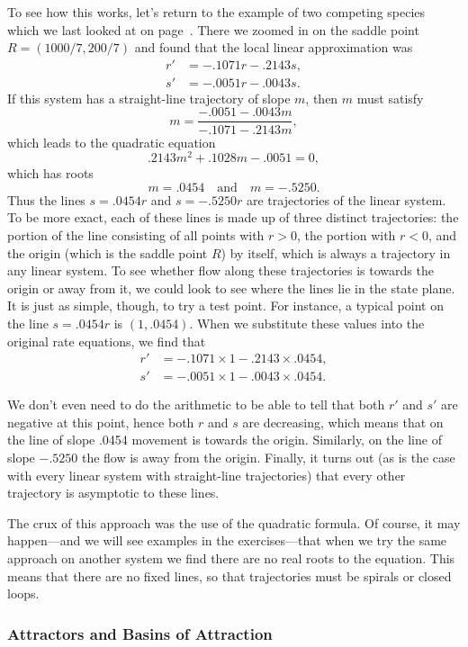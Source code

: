 To see how this works, let's return to the example of two competing
species which we last looked at on page~\pageref{`saddle'}.  There we
zoomed in on the saddle point $R=(1000/7, 200/7)$ and found that the
local linear approximation was
\begin{align*}
r' &= -.1071r -.2143s, \\
s' &= -.0051r - .0043s.
\end{align*}
If this system has a straight-line trajectory of slope $m$, then $m$
must satisfy
        \[
m= \dfrac{ -.0051 - .0043m}{ -.1071 -.2143m},
\]
which leads to the quadratic equation
        \[
.2143m^2+.1028m-.0051=0,
\]
which has roots
        \[
m=.0454 \quad \mbox{and} \quad m = -.5250.
\] 
Thus the lines $s=.0454r$ and $s=-.5250r$ are trajectories of the
linear system.  To be more exact, each of these lines is made up of
three distinct trajectories: the portion of the line consisting of all
points with $r>0$, the portion with $r<0$, and the origin (which is
the saddle point $R$) by itself, which is always a trajectory in any
linear system.  To see whether flow along these trajectories is
towards the origin or away from it, we could look to see where the
lines lie in the state plane.  It is just as simple, though, to try a
test point.  For instance, a typical point on the line $s=.0454r$ is
$(1, .0454)$.  When we substitute these values into the original rate
equations, we find that
\begin{align*}
r' &= -.1071\times 1-.2143\times .0454, \\
s' &= -.0051\times 1 - .0043 \times .0454.
\end{align*}

We don't even need to do the arithmetic to be able to tell that both
$r'$ and $s'$ are negative at this point, hence both $r$ and $s$ are
decreasing, which means that on the line of slope .0454 movement is
towards the origin.  Similarly, on the line of slope $-.5250$ the flow
is away from the origin.  Finally, it turns out (as is the case with
every linear system with straight-line trajectories) that every other
trajectory is asymptotic to these lines.

The crux of this approach was the use of the quadratic formula.  Of
course, it may happen---and we will see examples in the
exercises---that when we try the same approach on another system we
find there are no real roots to the equation.  This means that there
are no fixed lines, so that trajectories must be spirals or closed
loops.

\subsubsection{Attractors and Basins of Attraction}\label{`boundary'}
\label{subsubsec:attractors-and-basins-of-attraction}

